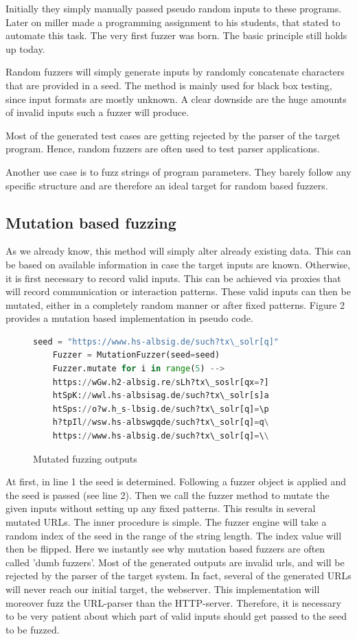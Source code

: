 \documentclass[journal=tosc,final]{iacrtrans}
\begin{document}
Initially they simply manually passed pseudo random inputs to these programs. Later on miller made a programming assignment to his students, that stated to automate this task. The very first fuzzer was born. The basic principle still holds up today. 

Random fuzzers will simply generate inputs by randomly concatenate characters that are provided in a seed. The method is mainly used for black box testing, since input formats are mostly unknown. A clear downside are the huge amounts of invalid inputs such a fuzzer will produce. 

Most of the generated test cases are getting rejected by the parser of the target program. Hence, random fuzzers are often used to test parser applications.

Another use case is to fuzz strings of program parameters. They barely follow any specific structure and are therefore an ideal target for random based fuzzers. 
\subsection{Mutation based fuzzing}
As we already know, this method will simply alter already existing data. This can be based on available information in case the target inputs are known. Otherwise, it is first necessary to record valid inputs. This can be achieved via proxies that will record communication or interaction patterns. These valid inputs can then be mutated, either in a completely random manner or after fixed patterns. Figure 2 provides a mutation based implementation in pseudo code. 

\begin{figure}[h]
\caption{Mutated fuzzing outputs}
 \begin{lstlisting}[language=python,style=code]
	seed = "https://www.hs-albsig.de/such?tx\_solr[q]"
	Fuzzer = MutationFuzzer(seed=seed)
	Fuzzer.mutate for i in range(5) -->
	https://wGw.h2-albsig.re/sLh?tx\_soslr[qx=?]
	htSpK://wwl.hs-albsisag.de/such?tx\_solr[s]a
	htSps://o?w.h_s-lbsig.de/such?tx\_solr[q]=\p
	h?tpIl//wsw.hs-albswgqde/such?tx\_solr[q]=q\
	https://www.hs-albsig.de/such?tx\_solr[q]=\\
\end{lstlisting}

\end{figure}
At first, in line 1 the seed is determined. Following a fuzzer object is applied and the seed is passed (see line 2). Then we call the fuzzer method to mutate the given inputs without setting up any fixed patterns. This results in several mutated URLs. The inner procedure is simple. The fuzzer engine will take a random index of the seed in the range of the string length. The index value will then be flipped.  Here we instantly see why mutation based fuzzers are often called 'dumb fuzzers'. 
Most of the generated outputs are invalid urls, and will be rejected by the parser of the target system. In fact, several of the generated URLs will never reach our initial target, the webserver. This implementation will moreover fuzz the URL-parser than the HTTP-server.
Therefore, it is necessary to be very patient about which part of valid inputs should get passed to the seed to be fuzzed. 
\end{document}
